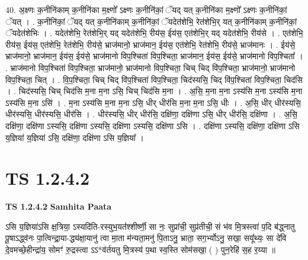\documentclass[17pt]{extarticle}
\begin{document}
40. अ॒क्ष्णः क॒नीनि॑काम् क॒नीनि॑का म॒क्ष्णो᳚ ऽक्ष्णः क॒नीनि॑कां॒ ॅयद् यत् क॒नीनि॑का म॒क्ष्णो᳚ ऽक्ष्णः क॒नीनि॑कां॒ ॅयत् । . क॒नीनि॑कां॒ ॅयद् यत् क॒नीनि॑काम् क॒नीनि॑कां॒ ॅयदेत॑शेभि॒ रेत॑शेभि॒र् यत् क॒नीनि॑काम् क॒नीनि॑कां॒ ॅयदेत॑शेभिः । . यदेत॑शेभि॒ रेत॑शेभि॒र् यद् यदेत॑शेभि॒ रीय॑स॒ ईय॑स॒ एत॑शेभि॒र् यद् यदेत॑शेभि॒ रीय॑से । . एत॑शेभि॒ रीय॑स॒ ईय॑स॒ एत॑शेभि॒ रेत॑शेभि॒ रीय॑से॒ भ्राज॑मानो॒ भ्राज॑मान॒ ईय॑स॒ एत॑शेभि॒ रेत॑शेभि॒ रीय॑से॒ भ्राज॑मानः । . ईय॑से॒ भ्राज॑मानो॒ भ्राज॑मान॒ ईय॑स॒ ईय॑से॒ भ्राज॑मानो विप॒श्चिता॑ विप॒श्चिता॒ भ्राज॑मान॒ ईय॑स॒ ईय॑से॒ भ्राज॑मानो विप॒श्चिता᳚ । . भ्राज॑मानो विप॒श्चिता॑ विप॒श्चिता॒ भ्राज॑मानो॒ भ्राज॑मानो विप॒श्चिता॒ चिच् चिद् वि॑प॒श्चिता॒ भ्राज॑मानो॒ भ्राज॑मानो विप॒श्चिता॒ चित् । . वि॒प॒श्चिता॒ चिच् चिद् वि॑प॒श्चिता॑ विप॒श्चिता॒ चिद॑स्यसि॒ चिद् वि॑प॒श्चिता॑ विप॒श्चिता॒ चिद॑सि । . चिद॑स्यसि॒ चिच् चिद॑सि म॒ना म॒ना ऽसि॒ चिच् चिद॑सि म॒ना । . अ॒सि॒ म॒ना म॒ना ऽस्य॑सि म॒ना ऽस्य॑सि म॒ना ऽस्य॑सि म॒ना ऽसि॑ । . म॒ना ऽस्य॑सि म॒ना म॒ना ऽसि॒ धीर् धीर॑सि म॒ना म॒ना ऽसि॒ धीः । . अ॒सि॒ धीर् धीर॑स्यसि॒ धीर॑स्यसि॒ धीर॑स्यसि॒ धीर॑सि । . धीर॑स्यसि॒ धीर् धीर॑सि॒ दक्षि॑णा॒ दक्षि॑णा ऽसि॒ धीर् धीर॑सि॒ दक्षि॑णा । . अ॒सि॒ दक्षि॑णा॒ दक्षि॑णा ऽस्यसि॒ दक्षि॑णा ऽस्यसि॒ दक्षि॑णा ऽस्यसि॒ दक्षि॑णा ऽसि । . दक्षि॑णा ऽस्यसि॒ दक्षि॑णा॒ दक्षि॑णा ऽसि य॒ज्ञिया॑ य॒ज्ञिया॑ ऽसि॒ दक्षि॑णा॒ दक्षि॑णा ऽसि य॒ज्ञिया᳚ । \newline
\pagebreak
{}

\section{ TS 1.2.4.2 }

\textbf{TS 1.2.4.2 } \newline
\textbf{Samhita Paata} \newline

ऽसि य॒ज्ञिया॑ऽसि क्ष॒त्रिया॒ ऽस्यदि॑ति-रस्युभ॒यत॑॑श्शीर्ष्णी॒ सा नः॒ सुप्रा॑ची॒ सुप्र॑तीची॒ सं भ॑व मि॒त्रस्त्वा॑ प॒दि ब॑द्ध्नातु पू॒षाऽद्ध्व॑नः पा॒त्विन्द्रा॒या-द्ध्य॑क्षा॒यानु॑ त्वा मा॒ता म॑न्यता॒मनु॑ पि॒ताऽनु॒ भ्राता॒ सग॒र्भ्योऽनु॒ सखा॒ सयू᳚थ्यः॒ सा दे॑वि दे॒वमच्छे॒हीन्द्रा॑य॒ सोमꣳ॑  रु॒द्रस्त्वा ऽऽ*व॑र्तयतु मि॒त्रस्य॑ प॒था स्व॒स्ति सोम॑सखा॒ ( ) पुन॒रेहि॑ स॒ह र॒य्या ॥ \newline
\end{document}
